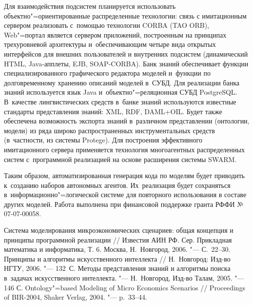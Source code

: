 \documentclass[twoside]{article}
\begin{document}
Для взаимодействия подсистем планируется использовать
объектно"=ориентированные распределенные технологии:
связь с имитационным сервером реализовать с~помощью технологии CORBA (TAO ORB),
Web"=портал является сервером приложений,
построенным на принципах трехуровневой архитектуры
и~обеспечивающим четыре вида открытых интерфейсов
для внешних пользователей и внутренних подсистем
(динамический HTML, Java-апплеты, EJB, SOAP-CORBA).
Банк знаний обеспечивает функции специализированного графического редактора моделей
и~функции по долговременному хранению описаний моделей в~СУБД.
Для реализации банка знаний используется язык Java и~объектно"=реляционная СУБД PostgreSQL.
В~качестве лингвистических средств в~банке знаний используются
известные стандарты представления знаний: XML, RDF, DAML+OIL.
Будет также обеспечена возможность экспорта знаний в~различном представлении
(онтологии, модели) из ряда широко распространенных инструментальных средств
(в~частности, из системы Protege).
Для построения эффективного имитационного
сервера применяется технология многоагентных распределенных систем
с~программной реализацией на основе расширения системы SWARM.

Таким образом, автоматизированная генерация кода по моделям
будет приводить к~созданию наборов автономных агентов.
Их~реализация будет сохраняться в~информационно"=логической системе
для повторного использования в составе других моделей.
Работа выполнена при финансовой поддержке гранта РФФИ №\,07-07-00058.

\begin{thebibliography}{1}
    Система моделирования микроэкономических сценариев:
    общая концепция и принципы программной реализации //
    Известия АИН РФ. Сер. Прикладная математика и информатика, Т. 6.
    Москва, Н.~Новгород, 2006. "--- С.~22--30.
    Принципы и алгоритмы искусственного интеллекта //
    Н.~Новгород: Изд-во НГТУ, 2006. "--- 132~С.
     Методы представления знаний и алгоритмы поиска
     в~задачах искусственного интеллекта. "---
     Н.~Новгород, Изд-во Талам, 2005. "--- 146 С.
     Ontology"=based Modeling of Micro Economics Scenarios //
     Proceedings of BIR-2004, Shaker Verlag, 2004. "--- p.~33--44.
\end{thebibliography}
\end{document}
